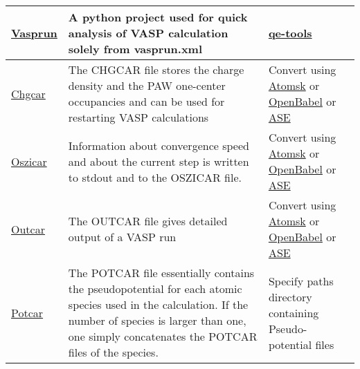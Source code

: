 \documentclass[12pt]{article}
\begin{document}
\begin{center}
\begin{table}[ht]
\begin{tabularx}{\linewidth}{|>{\RaggedRight}p{2.5cm}|x|x|}
 \href{https://vasprun-xml.readthedocs.io/en/latest/}{Vasprun} &
 A python project used for quick analysis of VASP calculation solely from vasprun.xml &
 \href{https://github.com/maxhutch/qe-tools/blob/master/README.md}{qe-tools} \\ \hline
 
 \href{https://www.vasp.at/wiki/index.php/CHGCAR}{Chgcar} &
 The CHGCAR file stores the charge density and the PAW one-center occupancies and can be used for restarting VASP calculations &
 Convert using \href{https://atomsk.univ-lille.fr/}{Atomsk} or \href{http://openbabel.org/wiki/Main_Page}{OpenBabel} or \href{https://wiki.fysik.dtu.dk/ase/}{ASE} \\ \hline
 
 \href{https://www.vasp.at/wiki/index.php/OSZICAR}{Oszicar} &
 Information about convergence speed and about the current step is written to stdout and to the OSZICAR file. &
 Convert using \href{https://atomsk.univ-lille.fr/}{Atomsk} or \href{http://openbabel.org/wiki/Main_Page}{OpenBabel} or \href{https://wiki.fysik.dtu.dk/ase/}{ASE} \\ \hline
 
 \href{https://www.vasp.at/wiki/index.php/OUTCAR}{Outcar} &
 The OUTCAR file gives detailed output of a VASP run &
 Convert using \href{https://atomsk.univ-lille.fr/}{Atomsk} or \href{http://openbabel.org/wiki/Main_Page}{OpenBabel} or \href{https://wiki.fysik.dtu.dk/ase/}{ASE} \\ \hline
 
 \href{https://www.vasp.at/wiki/index.php/POTCAR}{Potcar} &
 The POTCAR file essentially contains the pseudopotential for each atomic species used in the calculation. If the number of species is larger than one, one simply concatenates the POTCAR files of the species. &
 Specify paths directory containing Pseudo-potential files  \\ \hline
\end{tabularx}
\end{table}
\end{center}
\end{document}

